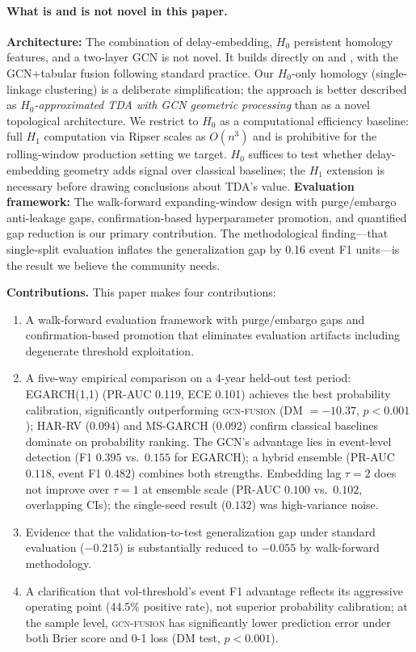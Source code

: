 \documentclass[sigconf]{acmart}
\begin{document}
\paragraph{What is and is not novel in this paper.}
\textbf{Architecture:} The combination of delay-embedding, $H_0$
persistent homology features, and a two-layer GCN is not novel.
It builds directly on \citet{gidea2018} and \citet{kipf2017},
with the GCN+tabular fusion following standard practice. Our $H_0$-only
homology (single-linkage clustering) is a deliberate simplification;
the approach is better described as \emph{$H_0$-approximated TDA with GCN
geometric processing} than as a novel topological architecture.
We restrict to $H_0$ as a computational efficiency baseline: full $H_1$
computation via Ripser \cite{edelsbrunner2010} scales as $O(n^3)$ and is
prohibitive for the rolling-window production setting we target.
$H_0$ suffices to test whether delay-embedding geometry adds signal over
classical baselines; the $H_1$ extension is necessary before drawing
conclusions about TDA's value.
\textbf{Evaluation framework:} The walk-forward expanding-window design
with purge/embargo anti-leakage gaps, confirmation-based hyperparameter
promotion, and quantified gap reduction is our primary contribution.
The methodological finding---that single-split evaluation inflates the
generalization gap by 0.16 event F1 units---is the result we believe the
community needs.

\smallskip\noindent\textbf{Contributions.} This paper makes four
contributions:
\begin{enumerate}
\item A walk-forward evaluation framework with purge/embargo gaps and
      confirmation-based promotion that eliminates evaluation artifacts
      including degenerate threshold exploitation.
\item A five-way empirical comparison on a 4-year held-out test period:
      EGARCH(1,1) (PR-AUC 0.119, ECE 0.101) achieves the best probability
      calibration, significantly outperforming \textsc{gcn-fusion}
      (DM $= {-}10.37$, $p{<}0.001$); HAR-RV (0.094) and MS-GARCH (0.092)
      confirm classical baselines dominate on probability ranking. The GCN's
      advantage lies in event-level detection (F1 $0.395$ vs.\ $0.155$ for
      EGARCH); a hybrid ensemble (PR-AUC $0.118$, event F1 $0.482$) combines
      both strengths. Embedding lag $\tau{=}2$ does not improve over
      $\tau{=}1$ at ensemble scale (PR-AUC $0.100$ vs.\ $0.102$,
      overlapping CIs); the single-seed result ($0.132$) was high-variance noise.
\item Evidence that the validation-to-test generalization gap under
      standard evaluation ($-0.215$) is substantially reduced to $-0.055$
      by walk-forward methodology.
\item A clarification that vol-threshold's event F1 advantage reflects its
      aggressive operating point (44.5\% positive rate), not superior
      probability calibration; at the sample level, \textsc{gcn-fusion}
      has significantly lower prediction error under both Brier score and
      0-1 loss (DM test, $p{<}0.001$).
\end{enumerate}
\end{document}
